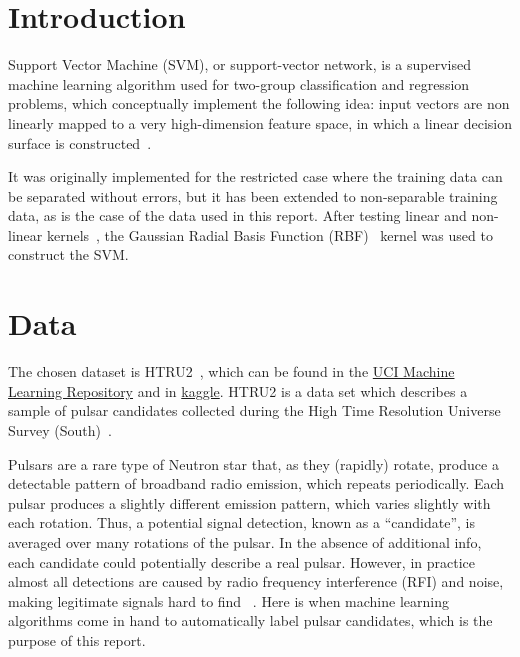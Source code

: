 \graphicspath{{./../script/pulsar-stars/}}

\section{Introduction}
Support Vector Machine (SVM), or support-vector network, is a supervised machine
learning algorithm used for two-group classification and regression problems,
which conceptually implement the following idea: input vectors are non
linearly mapped to a very high-dimension feature space, in which a linear
decision surface is constructed~\cite{cortes1995supportvector}.

It was originally implemented for the restricted case where the training data
can be separated without errors, but it has been extended to non-separable
training data, as is the case of the data used in this report.
After testing linear and non-linear 
kernels~\cite{boser1992training, aizerman2019theoretical}, the Gaussian Radial
Basis Function (RBF)~\cite{fornberg2011stable} kernel was used to construct the
SVM.

\section{Data}
The chosen dataset is HTRU2~\cite{misc_htru2_372},
which can be found in the
\href{https://archive.ics.uci.edu/dataset/372/htru2}{UCI Machine Learning Repository}
and in
\href{https://www.kaggle.com/datasets/charitarth/pulsar-dataset-htru2}{kaggle}.
HTRU2 is a data set which describes a sample of pulsar candidates collected
during the High Time Resolution Universe Survey (South)~\cite{2016MNRAS.459.1104L}.

Pulsars are a rare type of Neutron star that, as they (rapidly) rotate, produce 
a detectable pattern of broadband radio emission, which repeats periodically.
Each pulsar produces a slightly different emission pattern, which varies slightly
with each rotation. 
Thus, a potential signal detection, known as a ``candidate'', is averaged over many
rotations of the pulsar.
In the absence of additional info, each candidate could potentially describe a
real pulsar.
However, in practice almost all detections are caused by radio frequency
interference (RFI) and noise, making legitimate signals hard to find
~\cite{2016MNRAS.459.1104L, 2010MNRAS.409..619K, 2004hpa..book.....L}.
Here is when machine learning algorithms come in hand to automatically label
pulsar candidates, which is the purpose of this report.

